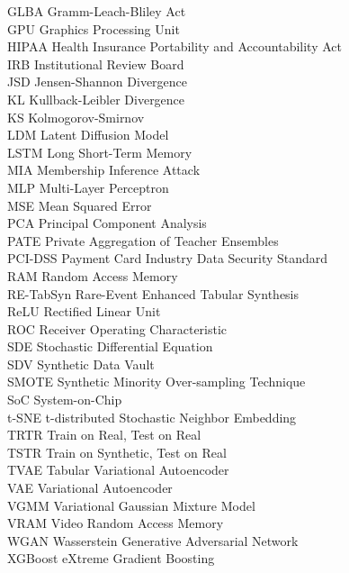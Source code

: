 \noindent GLBA \dotfill Gramm-Leach-Bliley Act \\[4pt]
\noindent GPU \dotfill Graphics Processing Unit \\[4pt]
\noindent HIPAA \dotfill Health Insurance Portability and Accountability Act \\[4pt]
\noindent IRB \dotfill Institutional Review Board \\[4pt]
\noindent JSD \dotfill Jensen-Shannon Divergence \\[4pt]
\noindent KL \dotfill Kullback-Leibler Divergence \\[4pt]
\noindent KS \dotfill Kolmogorov-Smirnov \\[4pt]
\noindent LDM \dotfill Latent Diffusion Model \\[4pt]
\noindent LSTM \dotfill Long Short-Term Memory \\[4pt]
\noindent MIA \dotfill Membership Inference Attack \\[4pt]
\noindent MLP \dotfill Multi-Layer Perceptron \\[4pt]
\noindent MSE \dotfill Mean Squared Error \\[4pt]
\noindent PCA \dotfill Principal Component Analysis \\[4pt]
\noindent PATE \dotfill Private Aggregation of Teacher Ensembles \\[4pt]
\noindent PCI-DSS \dotfill Payment Card Industry Data Security Standard \\[4pt]
\noindent RAM \dotfill Random Access Memory \\[4pt]
\noindent RE-TabSyn \dotfill Rare-Event Enhanced Tabular Synthesis \\[4pt]
\noindent ReLU \dotfill Rectified Linear Unit \\[4pt]
\noindent ROC \dotfill Receiver Operating Characteristic \\[4pt]
\noindent SDE \dotfill Stochastic Differential Equation \\[4pt]
\noindent SDV \dotfill Synthetic Data Vault \\[4pt]
\noindent SMOTE \dotfill Synthetic Minority Over-sampling Technique \\[4pt]
\noindent SoC \dotfill System-on-Chip \\[4pt]
\noindent t-SNE \dotfill t-distributed Stochastic Neighbor Embedding \\[4pt]
\noindent TRTR \dotfill Train on Real, Test on Real \\[4pt]
\noindent TSTR \dotfill Train on Synthetic, Test on Real \\[4pt]
\noindent TVAE \dotfill Tabular Variational Autoencoder \\[4pt]
\noindent VAE \dotfill Variational Autoencoder \\[4pt]
\noindent VGMM \dotfill Variational Gaussian Mixture Model \\[4pt]
\noindent VRAM \dotfill Video Random Access Memory \\[4pt]
\noindent WGAN \dotfill Wasserstein Generative Adversarial Network \\[4pt]
\noindent XGBoost \dotfill eXtreme Gradient Boosting
